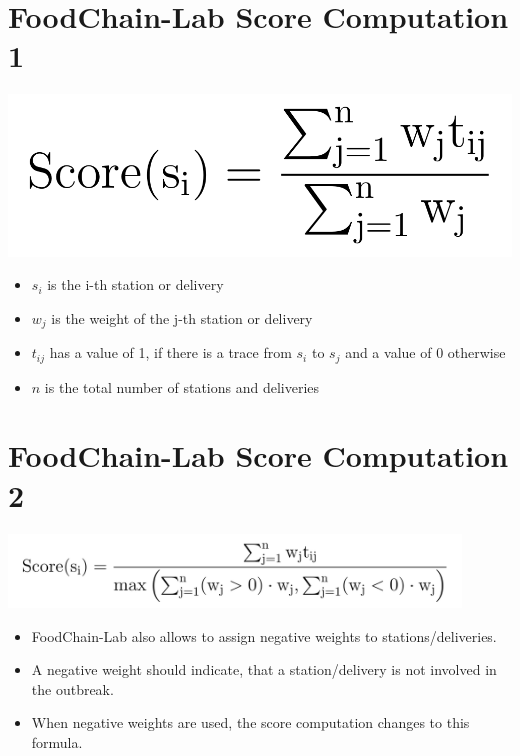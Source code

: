\documentclass{beamer}
\begin{document}
\section{FoodChain-Lab Score Computation 1}
\begin{frame}
	\begin{center}
  		\includegraphics[height=0.3\textheight]{score.png}
	\end{center}
	\begin{itemize}
		\item $s_i$ is the i-th station or delivery
		\item $w_j$ is the weight of the j-th station or delivery
		\item $t_{ij}$ has a value of 1, if there is a trace from $s_i$ to $s_j$ and a value of 0 otherwise
		\item $n$ is the total number of stations and deliveries
	\end{itemize}
\end{frame}

\section{FoodChain-Lab Score Computation 2}
\begin{frame}
	\begin{center}
  		\includegraphics[width=0.9\textwidth]{new_score.png}
	\end{center}
	\begin{itemize}
		\item FoodChain-Lab also allows to assign negative weights to stations/deliveries.
		\item A negative weight should indicate, that a station/delivery is not involved in the outbreak.
		\item When negative weights are used, the score computation changes to this formula.
	\end{itemize}
\end{frame}
\end{document}
